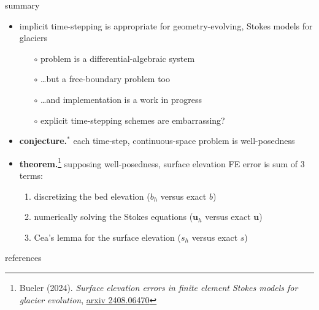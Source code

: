 \documentclass[10pt,dvipsnames]{beamer}
\theoremstyle{theorem}
\newcommand{\bu}{\mathbf{u}}
\begin{document}
\begin{frame}{summary}
\begin{itemize}
\item implicit time-stepping is appropriate for geometry-evolving, Stokes models for glaciers
    \begin{itemize}
    \item[$\circ$] problem is a differential-algebraic system
    \item[$\circ$] \dots but a free-boundary problem too
    \item[$\circ$] \dots and implementation is a work in progress
    \item[$\circ$] explicit time-stepping schemes are embarrassing?
    \end{itemize}
\item \textbf{conjecture.$^{\bm{*}}$} each time-step, continuous-space problem is well-posedness
\item \textbf{theorem.}\footnote[1]{Bueler (2024). \emph{Surface elevation errors in finite element Stokes models for glacier evolution}, \href{https://www.arxiv.org/abs/2408.06470}{arxiv 2408.06470}} supposing well-posedness, surface elevation FE error is sum of 3 terms:
    \begin{enumerate}
    \item discretizing the bed elevation ($b_h$ versus exact $b$)
    \item numerically solving the Stokes equations ($\bu_h$ versus exact $\bu$)
    \item Cea's lemma for the surface elevation ($s_h$ versus exact $s$) \strut
    \end{enumerate}
\end{itemize}
\end{frame}


\begin{frame}{references}

{\footnotesize }
\end{frame}




%
\end{document}
